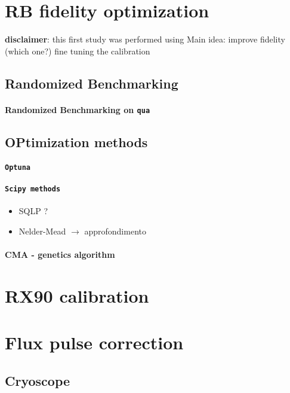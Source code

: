 \section{RB fidelity optimization}
\textbf{disclaimer}: this first study was performed using 
Main idea: improve fidelity (which one?) fine tuning the calibration

\subsection{Randomized Benchmarking}
\paragraph{Randomized Benchmarking on \tt{qua}}

\subsection{OPtimization methods}
\paragraph{\tt{Optuna}}
\paragraph{\tt{Scipy} methods}
\begin{itemize}
    \item SQLP ?
    \item Nelder-Mead $\rightarrow$ approfondimento
\end{itemize}
\paragraph{CMA - genetics algorithm}

\section{RX90 calibration}

\section{Flux pulse correction}
\subsection{Cryoscope}
\begin{comment}
    TO DO LIST:
    * calcoli analitic per assunzioni del cryoscope
    * calcoli analitici di convoluzioni per dimostrare che è giusto il modo in cui combiniamo i filtri
    * eventualmente provare ad aggiungere più correzioni esponenziali
\end{comment}
